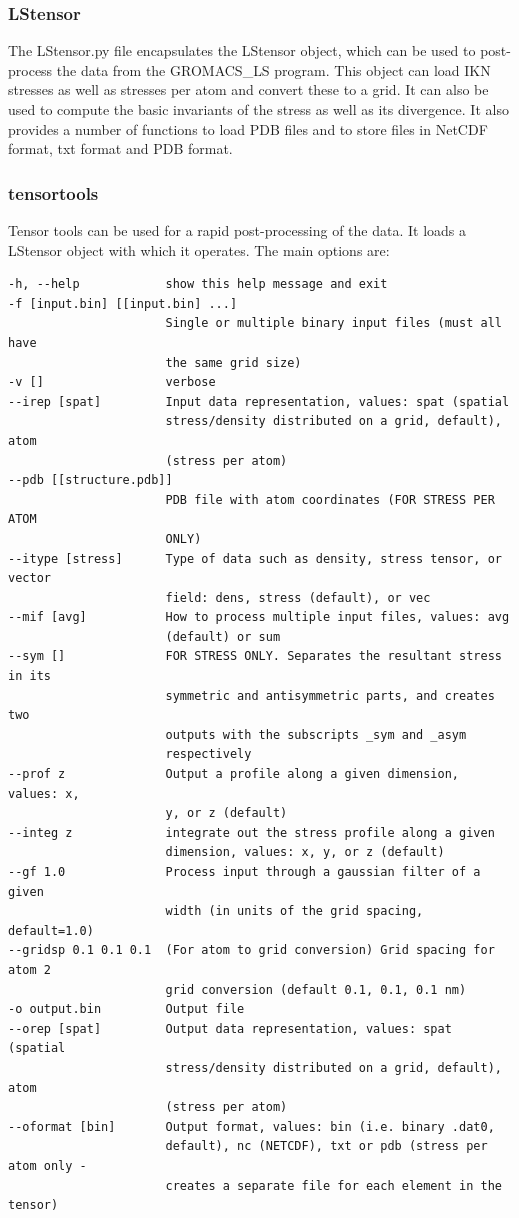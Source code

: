 \documentclass[10pt,letterpaper,notitlepage]{article}
\begin{document}
\subsubsection{LStensor}
The LStensor.py file encapsulates the LStensor object, which can be used to post-process the data from the GROMACS\_LS program. This object can load IKN stresses as well as stresses per atom and convert these to a grid. It can also be used to compute the basic invariants of the stress as well as its divergence. It also provides a number of functions to load PDB files and to store files in NetCDF format, txt format and PDB format.

\subsubsection{tensortools}
Tensor tools can be used for a rapid post-processing of the data. It loads a LStensor object with which it operates. The main options are:
\begin{lstlisting}[caption=Options for tensortools (tensortools -h)]
-h, --help            show this help message and exit
-f [input.bin] [[input.bin] ...]
                      Single or multiple binary input files (must all have
                      the same grid size)
-v []                 verbose
--irep [spat]         Input data representation, values: spat (spatial
                      stress/density distributed on a grid, default), atom
                      (stress per atom)
--pdb [[structure.pdb]]
                      PDB file with atom coordinates (FOR STRESS PER ATOM
                      ONLY)
--itype [stress]      Type of data such as density, stress tensor, or vector
                      field: dens, stress (default), or vec
--mif [avg]           How to process multiple input files, values: avg
                      (default) or sum
--sym []              FOR STRESS ONLY. Separates the resultant stress in its
                      symmetric and antisymmetric parts, and creates two
                      outputs with the subscripts _sym and _asym
                      respectively
--prof z              Output a profile along a given dimension, values: x,
                      y, or z (default)
--integ z             integrate out the stress profile along a given
                      dimension, values: x, y, or z (default)
--gf 1.0              Process input through a gaussian filter of a given
                      width (in units of the grid spacing, default=1.0)
--gridsp 0.1 0.1 0.1  (For atom to grid conversion) Grid spacing for atom 2
                      grid conversion (default 0.1, 0.1, 0.1 nm)
-o output.bin         Output file
--orep [spat]         Output data representation, values: spat (spatial
                      stress/density distributed on a grid, default), atom
                      (stress per atom)
--oformat [bin]       Output format, values: bin (i.e. binary .dat0,
                      default), nc (NETCDF), txt or pdb (stress per atom only - 
                      creates a separate file for each element in the tensor)
  
\end{lstlisting}
\end{document}
